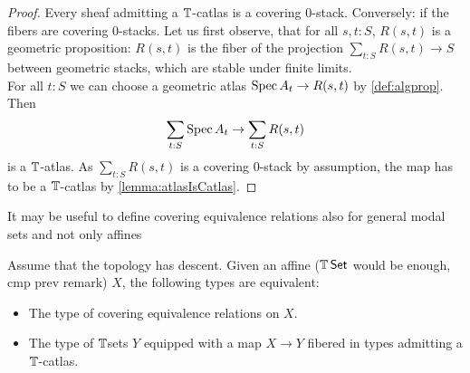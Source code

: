\begin{proof}
	Every sheaf admitting a $\mathbb{T}$-catlas is a covering 0-stack. 
	Conversely: if the fibers are covering 0-stacks. Let us first observe, that for all $s , t : S$, $R(s,t)$ is a geometric proposition: $R(s,t)$ is the fiber of the projection $\sum_{t : S} R(s,t) \to S$ between geometric stacks, which are stable under finite limits. \\
	
	For all $t : S$ we can choose a geometric atlas $\operatorname{Spec} A_t \to R(s,t)$ by \ref{def:algprop}. Then 
	\[
	\sum_{t:S} \operatorname{Spec} A_t \to \sum_{t : S} R(s,t)
	\]
	is a $\mathbb{T}$-atlas. As $\sum_{t : S} R(s,t)$ is a covering 0-stack by assumption, the map has to be a $\mathbb{T}$-catlas by \ref{lemma:atlasIsCatlas}. 
\end{proof}
\begin{think}
	It may be useful to define covering equivalence relations also for general modal sets and not only affines
\end{think}

\begin{lemma}{\label{lemma:fundamental-property-algebraic-spaces}}
	Assume that the topology has descent.
	Given an affine ($\mathbb{T} \operatorname{\mathsf {Set}}$ would be enough, cmp prev remark) $X$, the following types are equivalent:
	\begin{itemize}
		\item The type of covering equivalence relations on $X$.
		\item The type of $\mathbb{T}$sets $Y$ equipped with a map $X \to Y$ fibered in types admitting a $\mathbb{T}$-catlas.
	\end{itemize}
\end{lemma}


